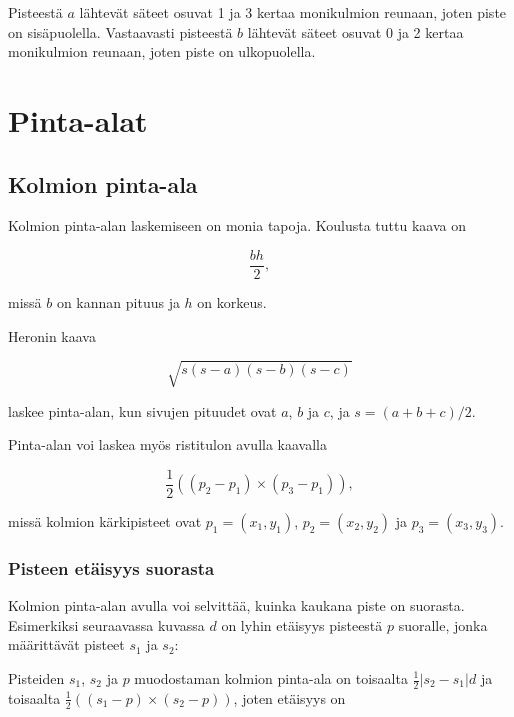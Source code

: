 Pisteestä $a$ lähtevät säteet osuvat 1 ja 3
kertaa monikulmion reunaan,
joten piste on sisäpuolella.
Vastaavasti pisteestä $b$ lähtevät
säteet osuvat 0 ja 2 kertaa monikulmion reunaan,
joten piste on ulkopuolella.

\section{Pinta-alat}

\subsection{Kolmion pinta-ala}

Kolmion pinta-alan laskemiseen on monia tapoja.
Koulusta tuttu kaava on

\[\frac{bh}{2},\]

\noindent
missä $b$ on kannan pituus ja $h$ on korkeus.

Heronin kaava

\[ \sqrt{s (s-a) (s-b) (s-c)} \]

\noindent
laskee pinta-alan, kun sivujen pituudet ovat
$a$, $b$ ja $c$, ja $s=(a+b+c)/2$.

Pinta-alan voi laskea myös ristitulon avulla
kaavalla

\[ \frac{1}{2} ((p_2-p_1) \times (p_3-p_1)), \]

\noindent
missä kolmion kärkipisteet ovat $p_1=(x_1,y_1)$,
$p_2=(x_2,y_2)$ ja $p_3=(x_3,y_3)$.

\subsubsection*{Pisteen etäisyys suorasta}

Kolmion pinta-alan avulla voi selvittää,
kuinka kaukana piste on suorasta.
Esimerkiksi seuraavassa kuvassa $d$
on lyhin etäisyys pisteestä $p$ suoralle,
jonka määrittävät pisteet $s_1$ ja $s_2$:
\\
\begin{center}
\end{center}

Pisteiden $s_1$, $s_2$ ja $p$ muodostaman kolmion
pinta-ala on toisaalta $\frac{1}{2} |s_2-s_1| d$ ja toisaalta
$\frac{1}{2} ((s_1-p) \times (s_2-p))$,
joten etäisyys on

